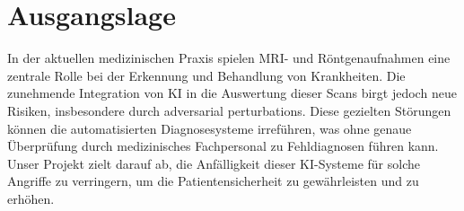 \section{Ausgangslage}
In der aktuellen medizinischen Praxis spielen MRI- und Röntgenaufnahmen eine zentrale Rolle bei der Erkennung und Behandlung von Krankheiten. Die zunehmende Integration von KI in die Auswertung dieser Scans birgt jedoch neue Risiken, insbesondere durch adversarial perturbations. Diese gezielten Störungen können die automatisierten Diagnosesysteme irreführen, was ohne genaue Überprüfung durch medizinisches Fachpersonal zu Fehldiagnosen führen kann. Unser Projekt zielt darauf ab, die Anfälligkeit dieser KI-Systeme für solche Angriffe zu verringern, um die Patientensicherheit zu gewährleisten und zu erhöhen.